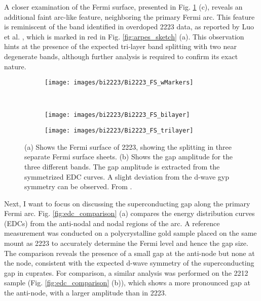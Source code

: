 A closer examination of the Fermi surface, presented in Fig. \ref{fig:bi2223_fs} (c), reveals an additional faint arc-like feature, neighboring the primary Fermi arc.
This feature is reminiscent of the band identified in overdoped 2223 data, as reported by Luo et al. \cite{luo_electronic_2023}, which is marked in red in Fig.  \ref{fig:arpes_sketch} (a).
This observation hints at the presence of the expected tri-layer band splitting with two near degenerate bands, although further analysis is required to confirm its exact nature.

\begin{figure}[t!]
	\centering
	\begin{subfigure}[b]{0.6\textwidth}
		\texttt{[image: images/bi2223/Bi2223\_FS\_wMarkers]}
		\caption{}
	\end{subfigure}
	\\
	\begin{subfigure}[b]{0.6\textwidth}
		\texttt{[image: images/bi2223/Bi2223\_FS\_bilayer]}
		\caption{}
	\end{subfigure}
	\begin{subfigure}[b]{0.3\textwidth}
		\texttt{[image: images/bi2223/Bi2223\_FS\_trilayer]}
		\caption{}
	\end{subfigure}
	\caption{(a) Shows the Fermi surface of 2223, showing the splitting in three separate Fermi surface sheets. (b) Shows the gap amplitude for the three different bands. The gap amplitude is extracted from the symmetrized EDC curves. A slight deviation from the d-wave gyp symmetry can be observed. From \cite{luo_electronic_2023}.}
	\label{fig:bi2223_fs}
\end{figure}

Next, I want to focus on discussing the superconducting gap along the primary Fermi arc.
Fig. \ref{fig:edc_comparison} (a) compares the energy distribution curves (EDCs) from the anti-nodal and nodal regions of the arc.
A reference measurement was conducted on a polycrystalline gold sample placed on the same mount as 2223 to accurately determine the Fermi level and hence the gap size.
The comparison reveals the presence of a small gap at the anti-node but none at the node, consistent with the expected d-wave symmetry of the superconducting gap in cuprates.
For comparison, a similar analysis was performed on the 2212 sample (Fig. \ref{fig:edc_comparison} (b)), which shows a more pronounced gap at the anti-node, with a larger amplitude than in 2223.

